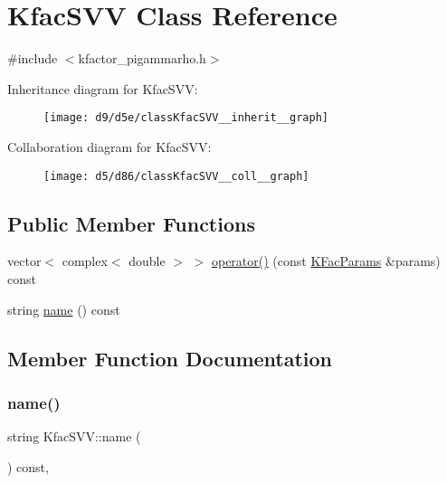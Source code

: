 \hypertarget{classKfacSVV}{}\section{Kfac\+S\+VV Class Reference}
\label{classKfacSVV}


{\ttfamily \#include $<$kfactor\+\_\+pigammarho.\+h$>$}



Inheritance diagram for Kfac\+S\+VV\+:\nopagebreak
\begin{figure}[H]
\begin{center}
\leavevmode
\texttt{[image: d9/d5e/classKfacSVV\_\_inherit\_\_graph]}
\end{center}
\end{figure}


Collaboration diagram for Kfac\+S\+VV\+:\nopagebreak
\begin{figure}[H]
\begin{center}
\leavevmode
\texttt{[image: d5/d86/classKfacSVV\_\_coll\_\_graph]}
\end{center}
\end{figure}
\subsection*{Public Member Functions}
\begin{DoxyCompactItemize}
\item 
vector$<$ complex$<$ double $>$ $>$ \mbox{\hyperlink{classKfacSVV_acb7f7f6bf0957694a73271704bb0569f}{operator()}} (const \mbox{\hyperlink{classKFacParams}{K\+Fac\+Params}} \&params) const
\item 
string \mbox{\hyperlink{classKfacSVV_ad7ab40ec924a678cd785a9743e676d6c}{name}} () const
\end{DoxyCompactItemize}


\subsection{Member Function Documentation}
\mbox{\label{classKfacSVV_ad7ab40ec924a678cd785a9743e676d6c}} 
\subsubsection{\texorpdfstring{name()}{name()}}
{\footnotesize\ttfamily string Kfac\+S\+V\+V\+::name (\begin{DoxyParamCaption}{ }\end{DoxyParamCaption}) const\hspace{0.3cm}{\ttfamily [inline]}, {\ttfamily [virtual]}}



